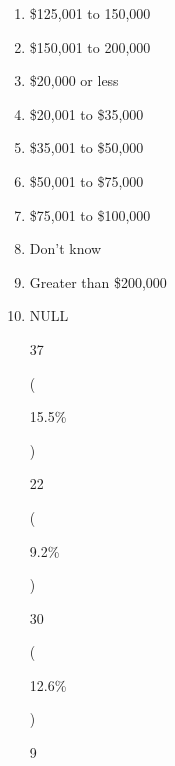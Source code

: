 \documentclass[]{article}
\providecommand{\tightlist}{%
  \setlength{\itemsep}{0pt}\setlength{\parskip}{0pt}}
\begin{document}
\begin{enumerate}
  (

  62.6\%

  )

  34

  (

  14.3\%

  )

  3

  (

  1.3\%

  )

  46

  (

  19.3\%

  )

  6

  (

  2.5\%

  )

  0 (0.0\%)

  12

  Household\_Income {[}character{]}

  \begin{enumerate}
  \def\labelenumii{\arabic{enumii}.}
  \tightlist
  \item
    \$100,001 to 125,000
  \end{enumerate}
\item
  \$125,001 to 150,000
\item
  \$150,001 to 200,000
\item
  \$20,000 or less
\item
  \$20,001 to \$35,000
\item
  \$35,001 to \$50,000
\item
  \$50,001 to \$75,000
\item
  \$75,001 to \$100,000
\item
  Don't know
\item
  Greater than \$200,000
\item
  NULL

  37

  (

  15.5\%

  )

  22

  (

  9.2\%

  )

  30

  (

  12.6\%

  )

  9


\end{enumerate}
\end{document}
